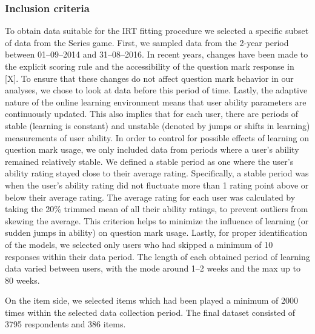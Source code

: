 \documentclass[12pt]{article}
\begin{document}
\subsubsection{Inclusion criteria}
To obtain data suitable for the IRT fitting procedure we selected a specific subset of data from the Series game. First, we sampled data from the 2-year period between 01--09--2014 and 31--08--2016. In recent years, changes have been made to the explicit scoring rule and the accessibility of the question mark response in [X]. To ensure that these changes do not affect question mark behavior in our analyses, we chose to look at data before this period of time. Lastly, the adaptive nature of the online learning environment means that user ability parameters are continuously updated. This also implies that for each user, there are periods of stable (learning is constant) and unstable (denoted by jumps or shifts in learning) measurements of user ability. In order to control for possible effects of learning on question mark usage, we only included data from periods where a user's ability remained relatively stable. We defined a stable period as one where the user's ability rating stayed close to their average rating. Specifically, a stable period was when the user's ability rating did not fluctuate more than 1 rating point above or below their average rating. The average rating for each user was calculated by taking the 20\% trimmed mean of all their ability ratings, to prevent outliers from skewing the average. This criterion helps to minimize the influence of learning (or sudden jumps in ability) on question mark usage. Lastly, for proper identification of the models, we selected only users who had skipped a minimum of 10 responses within their data period. The length of each obtained period of learning data varied between users, with the mode around 1--2 weeks and the max up to 80 weeks.

On the item side, we selected items which had been played a minimum of \num{2000} times within the selected data collection period. The final dataset consisted of \num{3795} respondents and \num{386} items. 
\end{document}
